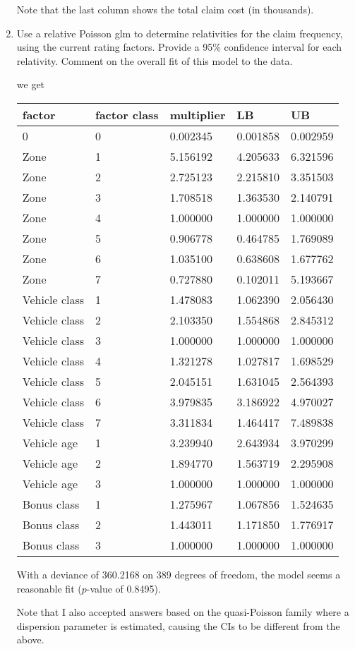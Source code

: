 \documentclass[11pt]{article}
\begin{document}
\begin{enumerate}
Note that the last column shows the total claim cost (in thousands).
\item Use a relative Poisson glm to determine relativities for the claim frequency, using the current rating factors.
Provide a 95\% confidence interval for each relativity. Comment on the overall fit of this model to the data.

 we get

\begin{tabular}{lllll}
\hline
factor & factor class & multiplier & LB & UB\\
\hline
0&0&0.002345&0.001858&0.002959\\
Zone&1&5.156192&4.205633&6.321596\\
Zone&2&2.725123&2.215810&3.351503\\
Zone&3&1.708518&1.363530&2.140791\\
Zone&4&1.000000&1.000000&1.000000\\
Zone&5&0.906778&0.464785&1.769089\\
Zone&6&1.035100&0.638608&1.677762\\
Zone&7&0.727880&0.102011&5.193667\\
Vehicle class&1&1.478083&1.062390&2.056430\\
Vehicle class&2&2.103350&1.554868&2.845312\\
Vehicle class&3&1.000000&1.000000&1.000000\\
Vehicle class&4&1.321278&1.027817&1.698529\\
Vehicle class&5&2.045151&1.631045&2.564393\\
Vehicle class&6&3.979835&3.186922&4.970027\\
Vehicle class&7&3.311834&1.464417&7.489838\\
Vehicle age&1&3.239940&2.643934&3.970299\\
Vehicle age&2&1.894770&1.563719&2.295908\\
Vehicle age&3&1.000000&1.000000&1.000000\\
Bonus class&1&1.275967&1.067856&1.524635\\
Bonus class&2&1.443011&1.171850&1.776917\\
Bonus class&3&1.000000&1.000000&1.000000\\
\hline
\end{tabular}

With a deviance of 360.2168 on 389 degrees of freedom, the model seems a reasonable fit ($p$-value of 0.8495).

Note that I also accepted answers based on the quasi-Poisson family where a dispersion parameter is estimated, causing the CIs to be different from the above.


\end{enumerate}
\end{document}
